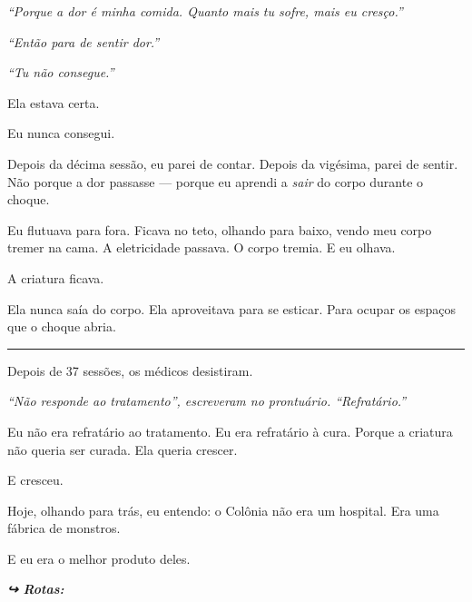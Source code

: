 \noindent \textit{\textquotedblleft{}Porque a dor é minha comida. Quanto mais tu sofre, mais eu cresço.\textquotedblright{}}

\noindent \textit{\textquotedblleft{}Então para de sentir dor.\textquotedblright{}}

\noindent \textit{\textquotedblleft{}Tu não consegue.\textquotedblright{}}

\noindent Ela estava certa.

\noindent Eu nunca consegui.

\noindent Depois da décima sessão, eu parei de contar. Depois da vigésima, parei de sentir. Não porque a dor passasse --- porque eu aprendi a \textit{sair} do corpo durante o choque.

\noindent Eu flutuava para fora. Ficava no teto, olhando para baixo, vendo meu corpo tremer na cama. A eletricidade passava. O corpo tremia. E eu olhava.

\noindent A criatura ficava.

\noindent Ela nunca saía do corpo.
Ela aproveitava para se esticar.
Para ocupar os espaços que o choque abria.

\vspace{0.5em}\noindent\rule{\textwidth}{0.5pt}\vspace{0.5em}

\noindent Depois de 37 sessões, os médicos desistiram.

\noindent \textit{\textquotedblleft{}Não responde ao tratamento\textquotedblright{}\textit{, escreveram no prontuário. }\textquotedblleft{}Refratário.\textquotedblright{}}

\noindent Eu não era refratário ao tratamento.
Eu era refratário à cura.
Porque a criatura não queria ser curada.
Ela queria crescer.

\noindent E cresceu.

\noindent Hoje, olhando para trás, eu entendo: o Colônia não era um hospital.
Era uma fábrica de monstros.

\noindent E eu era o melhor produto deles.

\vspace{0.5em}
\noindent\textit{\textbf{↪ Rotas:}  \rotasep {} \rotasep {}}